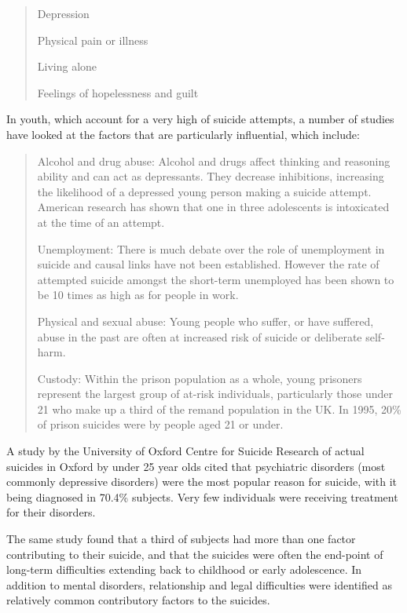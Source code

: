 \documentclass[12pt]{article}
\begin{document}
\begin{verse}

Depression

Physical pain or illness

Living alone

Feelings of hopelessness and guilt

\end{verse}

In youth, which account for a very high of suicide attempts, a number of studies have looked at the factors that are particularly influential, which include:

\begin{verse}

Alcohol and drug abuse: Alcohol and drugs affect thinking and reasoning ability and can act as depressants. They decrease inhibitions, increasing the likelihood of a depressed young person making a suicide attempt. American research has shown that one in three adolescents is intoxicated at the time of an attempt.

Unemployment: There is much debate over the role of unemployment in suicide and causal links have not been established. However the rate of attempted suicide amongst the short-term unemployed has been shown to be 10 times as high as for people in work.

Physical and sexual abuse: Young people who suffer, or have suffered, abuse in the past are often at increased risk of suicide or deliberate self-harm.

Custody: Within the prison population as a whole, young prisoners represent the largest group of at-risk individuals, particularly those under 21 who make up a third of the remand population in the UK. In 1995, 20\% of prison suicides were by people aged 21 or under.


\end{verse}

A study by the University of Oxford Centre for Suicide Research of actual suicides in Oxford by under 25 year olds cited that psychiatric disorders (most commonly depressive disorders) were the most popular reason for suicide, with it being diagnosed in 70.4\% subjects. Very few individuals were receiving treatment for their disorders.

The same study found that a third of subjects had more than one factor contributing to their suicide, and that the suicides were often the end-point of long-term difficulties extending back to childhood or early adolescence. In addition to mental disorders, relationship and legal difficulties were identified as relatively common contributory factors to the suicides.
\end{document}
